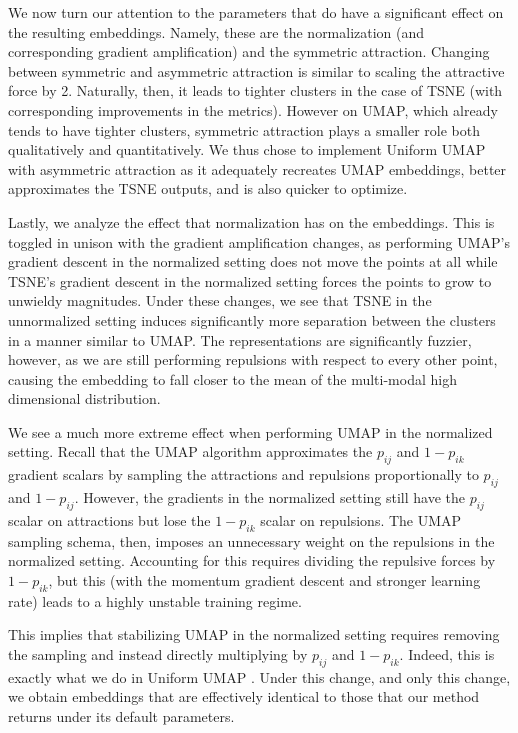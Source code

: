 \documentclass[sigconf, nonacm]{acmart}
\newcommand\ourmethod{Uniform UMAP }
\begin{document}
We now turn our attention to the parameters that do have a significant effect on the resulting embeddings. Namely, these are the normalization (and
corresponding gradient amplification) and the symmetric attraction. Changing between symmetric and asymmetric attraction is similar to scaling
the attractive force by 2. Naturally, then, it leads to tighter clusters in the case of TSNE (with corresponding improvements in the metrics). However on UMAP, which
already tends to have tighter clusters, symmetric attraction plays a smaller role both qualitatively and quantitatively. We thus chose to implement
\ourmethod with asymmetric attraction as it adequately recreates UMAP embeddings, better approximates the TSNE outputs, and is also quicker to optimize.

Lastly, we analyze the effect that normalization has on the embeddings. This is toggled in unison with the gradient amplification changes, as performing UMAP's
gradient descent in the normalized setting does not move the points at all while TSNE's gradient descent in the normalized setting forces the points to grow
to unwieldy magnitudes. Under these changes, we see that TSNE in the unnormalized setting induces significantly more separation between the clusters in a manner
similar to UMAP. The representations are significantly fuzzier, however, as we are still performing repulsions with respect to every other point, causing the
embedding to fall closer to the mean of the multi-modal high dimensional distribution.

We see a much more extreme effect when performing UMAP in the normalized setting. Recall that the UMAP algorithm approximates the $p_{ij}$ and $1 - p_{ik}$
gradient scalars by sampling the attractions and repulsions proportionally to $p_{ij}$ and $1 - p_{ij}$. However, the gradients in the normalized setting still
have the $p_{ij}$ scalar on attractions but lose the $1 - p_{ik}$ scalar on repulsions. The UMAP sampling schema, then, imposes an unnecessary weight on the
repulsions in the normalized setting.
Accounting for this requires dividing the repulsive forces by $1 - p_{ik}$, but this (with the momentum gradient descent and stronger learning rate) leads to
a highly unstable training regime.

This implies that stabilizing UMAP in the normalized setting requires removing the sampling and instead directly multiplying by $p_{ij}$ and $1 - p_{ik}$.
Indeed, this is exactly what we do in \ourmethod.
Under this change, and only this change, we obtain embeddings that are effectively identical to those that our method returns under its default parameters.
\end{document}
